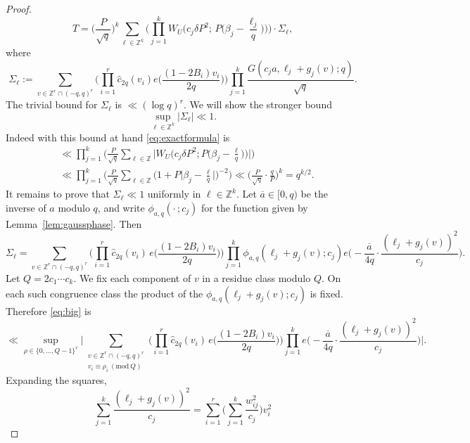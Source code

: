 \documentclass[a4paper,reqno,12pt]{amsart}
\theoremstyle{plain}
\theoremstyle{plain}
\theoremstyle{remark}
\theoremstyle{plain}
\newcommand{\Z}{\mathbb{Z}}
\theoremstyle{plain}
\theoremstyle{plain}
\begin{document}
{\begin{proof}
\begin{equation}
T=\Big(\frac {P}{\sqrt{q}}\Big)^k\sum_{\ell \in\Z^k}
\Big(\prod_{j=1}^kW_U\Big(c_j\delta P^2;\,P\Big(\beta_j-\frac{\ell_j}{q}\Big)\Big)\Big) \cdot \Sigma_{\ell},
\end{equation}
where
$$
\Sigma_{\ell}:=\sum_{v\in\Z^r\cap(-q,q)^r}
\Big(\prod_{i=1}^r\widehat c_{2q}(v_i) e \Big ( \frac{(1 - 2B_i) v_i}{2q} \Big ) \Big)
\prod_{j=1}^k \frac{G (c_ja,\ell_j + g_j(v);q)}{\sqrt{q}}.
$$
The trivial bound for $\Sigma_{\ell}$ is $\ll (\log q)^{r}$. We will show the
stronger {bound}
$$
\sup_{\ell \in \mathbb{Z}^k} |\Sigma_{\ell}| \ll 1. 
$$
Indeed with this bound at hand \eqref{eq:exactformula} is
\begin{align*}
& \ll \prod_{j = 1}^{k} \Big ( \frac{P}{\sqrt{q}} \sum_{\ell \in \mathbb{Z}} \Big | W_U \Big ( c_j \delta P^2 ; P \Big ( \beta_j - \frac{\ell}{q} \Big ) \Big ) \Big | \Big ) \\
& \ll \prod_{j = 1}^{k} \Big ( \frac{P}{\sqrt{q}} \sum_{\ell \in \mathbb{Z}} \Big ( 1 + P \Big | \beta_j - \frac{\ell}{q} \Big | \Big )^{-2} \Big ) \ll \Big ( \frac{P}{\sqrt{q}} \cdot \frac{q}{P} \Big )^{k} = q^{k / 2}.
\end{align*}
It remains to prove that $\Sigma_\ell\ll1$ uniformly in $\ell\in\Z^k$.
Let $\overline a\in[0,q)$ be the inverse of $a$ modulo $q$, and write
$\phi_{a,q}(\cdot\,;c_j)$ for the function given by
Lemma~\ref{lem:gaussphase}. Then
\begin{equation} \label{eq:big}
\Sigma_\ell=\sum_{v\in\Z^r\cap(-q,q)^r}
\Big(\prod_{i=1}^r\widehat c_{2q}(v_i)\,e\Big(\frac{(1-2B_i)v_i}{2q}\Big)\Big)
\prod_{j=1}^k\phi_{a,q}(\ell_j+g_j(v); c_j )
e\Big(-\frac{\overline a}{4q}\cdot\frac{(\ell_j+g_j(v))^2}{c_j}\Big).
\end{equation}
Let $Q = 2 {c_1 \cdots c_k}$. We fix each component of $v$ in a residue class
modulo $Q$. On each such congruence class the product of the $\phi_{a,q}(\ell_j + g_j(v); c_j)$ is
fixed. 
Therefore \eqref{eq:big} is
\begin{equation} \label{eq:crude}
\ll \sup_{\rho \in \{0,{\ldots},Q-1\}^r} \Big |
\sum_{\substack{v \in \mathbb{Z}^r \cap (-q, q)^r \\ v_i \equiv \rho_i \ (\mathrm{mod}\ Q)}}
\Big(\prod_{i = 1}^{r} \widehat{c}_{2q}(v_i)\, e \Big ( \frac{(1 - 2B_i) v_i}{2q} \Big )\Big)
\prod_{j=1}^k e \Big ( - \frac{\overline{a}}{4 q} \cdot \frac{(\ell_j + g_j(v))^2}{c_j} \Big ) \Big |.
\end{equation}
Expanding the squares,
$$
\sum_{j=1}^k\frac{(\ell_j+g_j(v))^2}{c_j}
=\sum_{i=1}^r\Big(\sum_{j=1}^k\frac{w_{ij}^2}{c_j}\Big)v_i^2
$$
\end{proof}}
\end{document}
